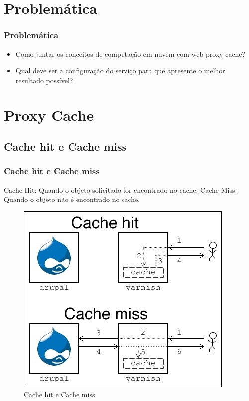 \documentclass{beamer}
\begin{document}
    \section{Problemática}
    \begin{frame}
     \frametitle{Problemática}
     \begin{itemize}
       \item Como juntar os conceitos de computação em nuvem com web proxy cache?
       \item Qual deve ser a configuração do serviço para que apresente o melhor resultado possível?
      \end{itemize}
    \end{frame}
    \section{Proxy Cache}
    \subsection{Cache hit e Cache miss}
    \begin{frame}
      \frametitle{Cache hit e Cache miss}
      Cache Hit: Quando o objeto solicitado for encontrado no cache.
      Cache Miss: Quando o objeto não é encontrado no cache.

      \begin{figure}
       \centering
       \includegraphics[scale=0.4]{imagens/cachehit.jpg}
       \caption{Cache hit e Cache miss}
      \end{figure}

    \end{frame}
\end{document}
